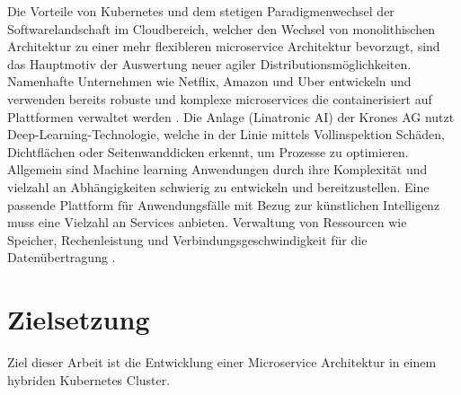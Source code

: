 Die Vorteile von Kubernetes und dem stetigen Paradigmenwechsel der Softwarelandschaft im Cloudbereich, welcher
den Wechsel von monolithischen Architektur zu einer mehr flexibleren microservice Architektur
bevorzugt, sind das Hauptmotiv der Auswertung neuer agiler Distributionsmöglichkeiten.
Namenhafte Unternehmen wie Netflix, Amazon und Uber entwickeln und verwenden
bereits robuste und komplexe microservices die containerisiert auf Plattformen
verwaltet werden \cite{microservice}. 
Die Anlage (Linatronic AI) der Krones AG nutzt Deep-Learning-Technologie,
welche in der Linie mittels Vollinspektion Schäden, Dichtflächen oder Seitenwanddicken
erkennt, um Prozesse zu optimieren. Allgemein sind Machine learning Anwendungen durch ihre Komplexität
und vielzahl an Abhängigkeiten schwierig zu entwickeln und bereitzustellen. 
Eine passende Plattform für Anwendungsfälle mit Bezug zur künstlichen Intelligenz
muss eine Vielzahl an Services anbieten. Verwaltung von Ressourcen wie Speicher,
Rechenleistung und Verbindungsgeschwindigkeit für die Datenübertragung \cite{mlops}. 

\section{Zielsetzung}
Ziel dieser Arbeit ist die Entwicklung einer Microservice
Architektur in einem hybriden Kubernetes Cluster. 

